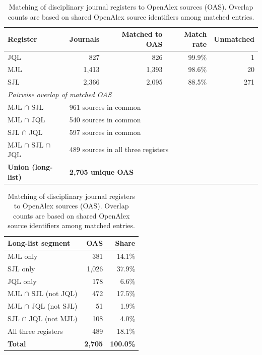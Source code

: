 \documentclass[10pt]{article}
\begin{document}
\begin{table}[ht]
	\centering
	\caption{Matching of disciplinary journal registers to OpenAlex sources (OAS).
		Overlap counts are based on shared OpenAlex source identifiers among matched entries.}
	\label{tab:oas_matching}
	\small
	\begin{tabular}{lrrrr}
		\toprule
		\textbf{Register} & \textbf{Journals} & \textbf{Matched to OAS} & \textbf{Match rate} & \textbf{Unmatched} \\
		\midrule
		JQL  &    827 &    826 & 99.9\% &   1 \\
		MJL  & 1{,}413 & 1{,}393 & 98.6\% &  20 \\
		SJL  & 2{,}366 & 2{,}095 & 88.5\% & 271 \\
		\midrule
		\multicolumn{5}{l}{\textit{Pairwise overlap of matched OAS}} \\
		\quad MJL $\cap$ SJL  & \multicolumn{4}{l}{961 sources in common} \\
		\quad MJL $\cap$ JQL  & \multicolumn{4}{l}{540 sources in common} \\
		\quad SJL $\cap$ JQL  & \multicolumn{4}{l}{597 sources in common} \\
		\quad MJL $\cap$ SJL $\cap$ JQL & \multicolumn{4}{l}{489 sources in all three registers} \\
		\midrule
		\textbf{Union (long-list)} & \multicolumn{4}{l}{\textbf{2{,}705 unique OAS}} \\
		\bottomrule
	\end{tabular}
	
	\bigskip
	\begin{tabular}{lrr}
		\toprule
		\textbf{Long-list segment} & \textbf{OAS} & \textbf{Share} \\
		\midrule
		MJL only                      &  381 & 14.1\% \\
		SJL only                      & 1{,}026 & 37.9\% \\
		JQL only                      &  178 &  6.6\% \\
		MJL $\cap$ SJL (not JQL)      &  472 & 17.5\% \\
		MJL $\cap$ JQL (not SJL)      &   51 &  1.9\% \\
		SJL $\cap$ JQL (not MJL)      &  108 &  4.0\% \\
		All three registers           &  489 & 18.1\% \\
		\midrule
		\textbf{Total}                & \textbf{2{,}705} & \textbf{100.0\%} \\
		\bottomrule
	\end{tabular}
\end{table}
\end{document}

